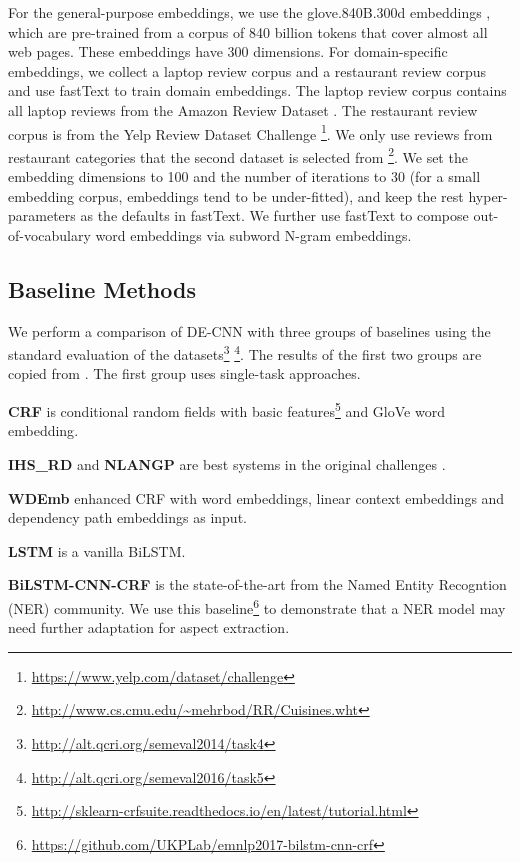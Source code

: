 \documentclass[11pt,a4paper]{article}
\begin{document}
For the general-purpose embeddings, we use the glove.840B.300d embeddings \cite{pennington2014glove}, which are pre-trained from a corpus of 840 billion tokens that cover almost all web pages. These embeddings have 300 dimensions.
For domain-specific embeddings, we collect a laptop review corpus and a restaurant review corpus and use fastText \cite{bojanowski2016enriching} to train domain embeddings.  
The laptop review corpus contains all laptop reviews from the Amazon Review Dataset \cite{he2016ups}.
The restaurant review corpus is from the Yelp Review Dataset Challenge \footnote{\url{https://www.yelp.com/dataset/challenge} }.
We only use reviews from restaurant categories that the second dataset is selected from \footnote{\url{http://www.cs.cmu.edu/~mehrbod/RR/Cuisines.wht} }.
We set the embedding dimensions to 100 and the number of iterations to 30 (for a small embedding corpus, embeddings tend to be under-fitted), and keep the rest hyper-parameters as the defaults in fastText.
We further use fastText to compose out-of-vocabulary word embeddings via subword N-gram embeddings.

\subsection{Baseline Methods}
We perform a comparison of DE-CNN with three groups of baselines using the standard evaluation of the datasets\footnote{\url{http://alt.qcri.org/semeval2014/task4}} \footnote{\url{http://alt.qcri.org/semeval2016/task5}}.
The results of the first two groups are copied from \cite{li2017deep}.
The first group uses single-task approaches.

\textbf{CRF} is conditional random fields with basic features\footnote{\url{http://sklearn-crfsuite.readthedocs.io/en/latest/tutorial.html} } and GloVe word embedding\cite{pennington2014glove}.

\textbf{IHS\_RD} \cite{chernyshevich2014ihs} and \textbf{NLANGP} \cite{toh2016nlangp} are best systems in the original challenges \cite{pontiki2014SemEval,pontiki2016semeval}.

\textbf{WDEmb} \cite{yin2016unsupervised} enhanced CRF with word embeddings, linear context embeddings and dependency path embeddings as input.

\textbf{LSTM} \cite{liu2015fine,li2017deep} is a vanilla BiLSTM.

\textbf{BiLSTM-CNN-CRF} \cite{Reimers:2017:EMNLP} is the state-of-the-art from the Named Entity Recogntion (NER) community. We use this baseline\footnote{\url{https://github.com/UKPLab/emnlp2017-bilstm-cnn-crf} } to demonstrate that a NER model may need further adaptation for aspect extraction.
\end{document}
